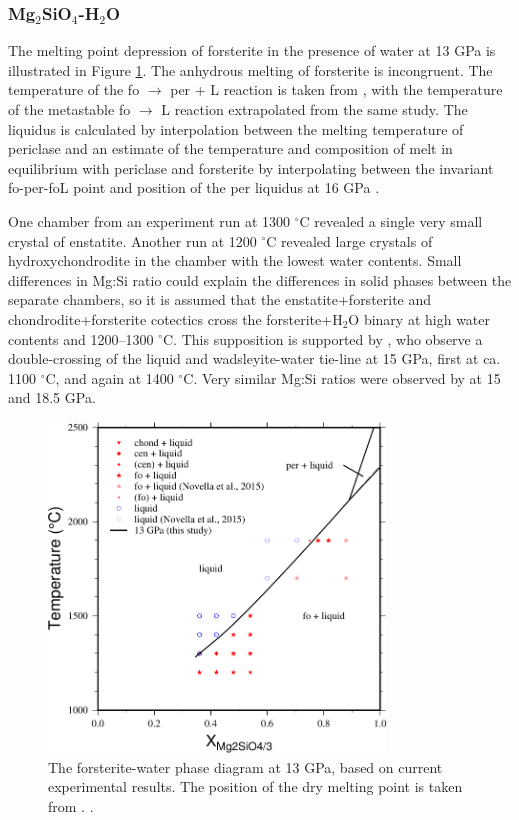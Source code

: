 \documentclass[review]{elsarticle}
\begin{document}
\clearpage
\subsubsection{Mg$_2$SiO$_4$-H$_2$O}
The melting point depression of forsterite in the presence of water at 13 GPa is illustrated in Figure \ref{fig:foH}. The anhydrous melting of forsterite is incongruent. The temperature of the fo $\rightarrow$ per + L reaction is taken from \citep{PW1993}, with the temperature of the metastable fo $\rightarrow$ L reaction extrapolated from the same study. The liquidus is calculated by interpolation between the melting temperature of periclase \citep{ZF2008} and an estimate of the temperature and composition of melt in equilibrium with periclase and forsterite by interpolating between the invariant fo-per-foL point \citep{PW1993} and position of the per liquidus at 16 GPa \citep{LF2012}.

One chamber from an experiment run at 1300 $^{\circ}$C revealed a single very small crystal of enstatite. Another run at 1200 $^{\circ}$C revealed large crystals of hydroxychondrodite in the chamber with the lowest water contents. Small differences in Mg:Si ratio could explain the differences in solid phases between the separate chambers, so it is assumed that the enstatite+forsterite and chondrodite+forsterite cotectics cross the forsterite+H$_2$O binary at high water contents and 1200--1300 $^{\circ}$C. This supposition is supported by \cite{DDFK2005}, who observe a double-crossing of the liquid and wadsleyite-water tie-line at 15 GPa, first at ca. 1100 $^{\circ}$C, and again at 1400 $^{\circ}$C. Very similar Mg:Si ratios were observed by \citep{LSOK2011} at 15 and 18.5 GPa.

\begin{figure}[ht!]
  \centering
      \includegraphics[width=0.8\textwidth]{figures/fo-H2O}
  \caption{The forsterite-water phase diagram at 13 GPa, based on current experimental results. The position of the dry melting point is taken from \citep{PW1993}. \citep{LF2012}.}
  \label{fig:foH}
\end{figure}
\clearpage
\end{document}
